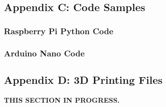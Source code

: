 \documentclass{article}
\begin{document}
	\subsection{Appendix C: Code Samples \label{appendix:code}}
	
		\subsubsection{Raspberry Pi Python Code}
		
		\subsubsection{Arduino Nano Code}
	
	\subsection{Appendix D: 3D Printing Files}
	\textbf{THIS SECTION IN PROGRESS.}
	
\end{document}

